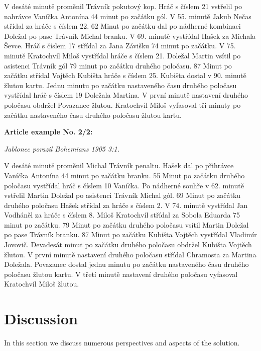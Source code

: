 V desáté minutě proměnil Trávník pokutový kop. Hráč s číslem 21 vstřelil po nahrávce Vaníčka Antonína 44 minut po začátku gól. V 55. minutě Jakub Nečas střídal za hráče s číslem 22. 62 Minut po začátku dal po nádherné kombinaci Doležal po pase Trávník Michal branku. V 69. minutě vystřídal Hašek za Michala Ševce. Hráč s číslem 17 střídal za Jana Závišku 74 minut po začátku. V 75. minutě Kratochvíl Miloš vystřídal hráče s číslem 21. Doležal Martin vsítil po asistenci Trávník gól 79 minut po začátku druhého poločasu. 87 Minut po začátku střídal Vojtěch Kubišta hráče s číslem 25. Kubišta dostal v 90. minutě žlutou kartu. Jednu minutu po začátku nastaveného času druhého poločasu vystřídal hráč s číslem 19 Doležala Martina. V první minutě nastavení druhého poločasu obdržel Povazanec žlutou. Kratochvíl Miloš vyfasoval tři minuty po začátku nastaveného času druhého poločasu žlutou kartu.

\noindent\makebox[\linewidth]{\rule{\textwidth}{0.4pt}}
\textbf{Article example No. 2/2:}
\begin{center}
\textit{	Jablonec porazil Bohemians 1905 3:1.}
\end{center}                                      

V desáté minutě proměnil Michal Trávník penaltu. Hašek dal po přihrávce Vaníčka Antonína 44 minut po začátku branku. 55 Minut po začátku druhého poločasu vystřídal hráč s číslem 10 Vaníčka. Po nádherné souhře v 62. minutě vstřelil Martin Doležal po asistenci Trávník Michal gól. 69 Minut po začátku druhého poločasu Hašek střídal za hráče s číslem 2. V 74. minutě vystřídal Jan Vodháněl za hráče s číslem 8. Miloš Kratochvíl střídal za Sobola Eduarda 75 minut po začátku. 79 Minut po začátku druhého poločasu vsítil Martin Doležal po pase Trávník branku. 87 Minut po začátku Kubišta Vojtěch vystřídal Vladimír Jovovič. Devadesát minut po začátku druhého poločasu obdržel Kubišta Vojtěch žlutou. V první minutě nastavení druhého poločasu střídal Chramosta za Martina Doležala. Povazanec dostal jednu minutu po začátku nastaveného času druhého poločasu žlutou kartu. V třetí minutě nastavení druhého poločasu vyfasoval Kratochvíl Miloš žlutou.

\noindent\makebox[\linewidth]{\rule{\textwidth}{0.4pt}}

\section{Discussion}
In this section we discuss numerous perspectives and aspects of the solution.


